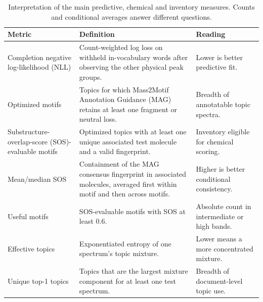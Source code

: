 \documentclass[10pt,a4paper]{article}
\begin{document}
\begin{table}[H]
\centering
\small
\begin{tabular}{@{}>{\raggedright\arraybackslash}p{}
>{\raggedright\arraybackslash}p{}
>{\raggedright\arraybackslash}p{}@{}}
\toprule
Metric & Definition & Reading \\
\midrule
Completion negative log-likelihood (NLL) &
Count-weighted log loss on withheld in-vocabulary words after observing the
other physical peak groups. &
Lower is better predictive fit. \\
Optimized motifs &
Topics for which Mass2Motif Annotation Guidance (MAG) retains at least one
fragment or neutral loss. &
Breadth of annotatable topic spectra. \\
Substructure-overlap-score (SOS)-evaluable motifs &
Optimized topics with at least one unique associated test molecule and a
valid fingerprint. &
Inventory eligible for chemical scoring. \\
Mean/median SOS &
Containment of the MAG consensus fingerprint in associated molecules, averaged
first within motif and then across motifs. &
Higher is better conditional consistency. \\
Useful motifs &
SOS-evaluable motifs with SOS at least 0.6. &
Absolute count in intermediate or high bands. \\
Effective topics &
Exponentiated entropy of one spectrum's topic mixture. &
Lower means a more concentrated mixture. \\
Unique top-1 topics &
Topics that are the largest mixture component for at least one test
spectrum. &
Breadth of document-level topic use. \\
\bottomrule
\end{tabular}
\caption{Interpretation of the main predictive, chemical and inventory
measures. Counts and conditional averages answer different questions.}
\label{tab:metric-interpretation}
\end{table}
\end{document}
